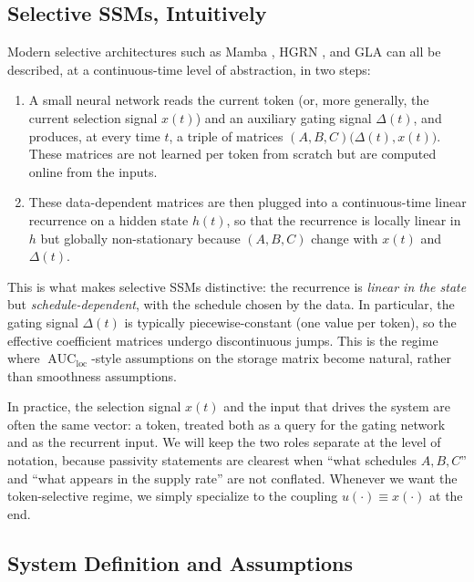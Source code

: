 \documentclass[10pt]{article} %
\newcommand{\loc}{\mathrm{loc}}                         %
\DeclareMathOperator{\AUC}{AUC}                         %
\theoremstyle{definition}
\begin{document}
\subsection{Selective SSMs, Intuitively}
\label{subsec:selective_ssms_intuition}

Modern selective architectures such as Mamba \citep{gu2024mamba}, HGRN \citep{qin2024hgrn2}, and GLA \citep{yang2024gla} can all be described, at a continuous-time level of abstraction, in two steps:
\begin{enumerate}[label=(\roman*)]
    \item A small neural network reads the current token (or, more generally, the current selection signal $x(t)$) and an auxiliary gating signal $\Delta(t)$, and produces, at every time $t$, a triple of matrices $(A,B,C)\bigl(\Delta(t),x(t)\bigr)$. These matrices are not learned per token from scratch but are computed online from the inputs.
    \item These data-dependent matrices are then plugged into a continuous-time linear recurrence on a hidden state $h(t)$, so that the recurrence is locally linear in $h$ but globally non-stationary because $(A,B,C)$ change with $x(t)$ and $\Delta(t)$.
\end{enumerate}
This is what makes selective SSMs distinctive: the recurrence is \emph{linear in the state} but \emph{schedule-dependent}, with the schedule chosen by the data. In particular, the gating signal $\Delta(t)$ is typically piecewise-constant (one value per token), so the effective coefficient matrices undergo discontinuous jumps. This is the regime where $\AUC_{\loc}$-style assumptions on the storage matrix become natural, rather than smoothness assumptions.

In practice, the selection signal $x(t)$ and the input that drives the system are often the same vector: a token, treated both as a query for the gating network and as the recurrent input. We will keep the two roles separate at the level of notation, because passivity statements are clearest when ``what schedules $A,B,C$'' and ``what appears in the supply rate'' are not conflated. Whenever we want the token-selective regime, we simply specialize to the coupling $u(\cdot)\equiv x(\cdot)$ at the end.

\subsection{System Definition and Assumptions}
\label{subsec:system_definition_and_notation}
\end{document}
